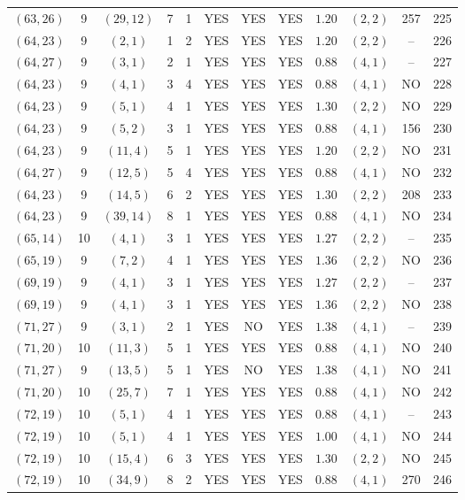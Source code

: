 \begin{longtable}{|c|c|c|c|c|c|c|c|c|c|c|c|}
$(63,26)$ & 9 & $(29,12)$ & 7 & 1 & YES & YES & YES & $1.20$ & $(2,2)$ & 257 & 225\\
$(64,23)$ & 9 & $(2,1)$ & 1 & 2 & YES & YES & YES & $1.20$ & $(2,2)$ & -- & 226\\
$(64,27)$ & 9 & $(3,1)$ & 2 & 1 & YES & YES & YES & $0.88$ & $(4,1)$ & -- & 227\\
$(64,23)$ & 9 & $(4,1)$ & 3 & 4 & YES & YES & YES & $0.88$ & $(4,1)$ & NO & 228\\
$(64,23)$ & 9 & $(5,1)$ & 4 & 1 & YES & YES & YES & $1.30$ & $(2,2)$ & NO & 229\\
$(64,23)$ & 9 & $(5,2)$ & 3 & 1 & YES & YES & YES & $0.88$ & $(4,1)$ & 156 & 230\\
$(64,23)$ & 9 & $(11,4)$ & 5 & 1 & YES & YES & YES & $1.20$ & $(2,2)$ & NO & 231\\
$(64,27)$ & 9 & $(12,5)$ & 5 & 4 & YES & YES & YES & $0.88$ & $(4,1)$ & NO & 232\\
$(64,23)$ & 9 & $(14,5)$ & 6 & 2 & YES & YES & YES & $1.30$ & $(2,2)$ & 208 & 233\\
$(64,23)$ & 9 & $(39,14)$ & 8 & 1 & YES & YES & YES & $0.88$ & $(4,1)$ & NO & 234\\
$(65,14)$ & 10 & $(4,1)$ & 3 & 1 & YES & YES & YES & $1.27$ & $(2,2)$ & -- & 235\\
$(65,19)$ & 9 & $(7,2)$ & 4 & 1 & YES & YES & YES & $1.36$ & $(2,2)$ & NO & 236\\
$(69,19)$ & 9 & $(4,1)$ & 3 & 1 & YES & YES & YES & $1.27$ & $(2,2)$ & -- & 237\\
$(69,19)$ & 9 & $(4,1)$ & 3 & 1 & YES & YES & YES & $1.36$ & $(2,2)$ & NO & 238\\
$(71,27)$ & 9 & $(3,1)$ & 2 & 1 & YES & NO & YES & $1.38$ & $(4,1)$ & -- & 239\\
$(71,20)$ & 10 & $(11,3)$ & 5 & 1 & YES & YES & YES & $0.88$ & $(4,1)$ & NO & 240\\
$(71,27)$ & 9 & $(13,5)$ & 5 & 1 & YES & NO & YES & $1.38$ & $(4,1)$ & NO & 241\\
$(71,20)$ & 10 & $(25,7)$ & 7 & 1 & YES & YES & YES & $0.88$ & $(4,1)$ & NO & 242\\
$(72,19)$ & 10 & $(5,1)$ & 4 & 1 & YES & YES & YES & $0.88$ & $(4,1)$ & -- & 243\\
$(72,19)$ & 10 & $(5,1)$ & 4 & 1 & YES & YES & YES & $1.00$ & $(4,1)$ & NO & 244\\
$(72,19)$ & 10 & $(15,4)$ & 6 & 3 & YES & YES & YES & $1.30$ & $(2,2)$ & NO & 245\\
$(72,19)$ & 10 & $(34,9)$ & 8 & 2 & YES & YES & YES & $0.88$ & $(4,1)$ & 270 & 246\\

\end{longtable}

